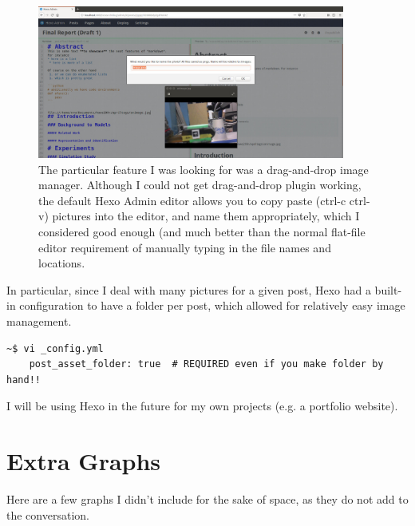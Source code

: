\documentclass[preprint,12pt,3p]{elsarticle}
\begin{document}
\begin{figure}[H]
\centering
\includegraphics[width=0.9\textwidth]{images/misc/hexo_image.jpg}
\caption{The particular feature I was looking for was a drag-and-drop image manager. Although I
    could not get drag-and-drop plugin working, the default Hexo Admin editor allows you to copy
    paste (ctrl-c ctrl-v) pictures into the editor, and name them appropriately, which I considered
    good enough (and much better than the normal flat-file editor requirement of manually typing in
the file names and locations.}
\end{figure}

In particular, since I deal with many pictures for a given post, Hexo had a built-in configuration
to have a folder per post, which allowed for relatively easy image management.
\begin{lstlisting}
~$ vi _config.yml
    post_asset_folder: true  # REQUIRED even if you make folder by hand!!
\end{lstlisting}

I will be using Hexo in the future for my own projects (e.g. a portfolio website).


\section{Extra Graphs}
\label{appendix-graphs}

Here are a few graphs I didn't include for the sake of space, as they do not add
to the conversation.
\end{document}
